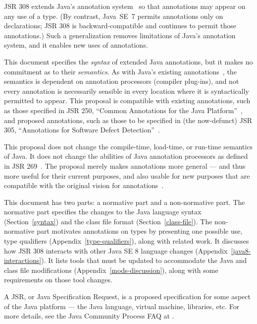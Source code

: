 \documentclass[10pt]{article}
\begin{document}
JSR 308 extends Java's annotation system~\cite{JSR175} so that
annotations may appear on any use of a type.
(By contrast, Java~SE~7 permits annotations only on
declarations; JSR 308 is
backward-compatible and continues to permit those annotations.)
Such a generalization removes
limitations of Java's annotation
system, and it enables new uses of annotations.

This document specifies the \emph{syntax} of extended Java annotations, but
it makes no commitment as to their \emph{semantics}.  As with Java's
existing annotations~\cite{JSR175}, the semantics is dependent on annotation processors
(compiler plug-ins), and not every annotation is necessarily sensible in
every location where it is syntactically permitted to appear.
This proposal is compatible with existing annotations,
such as those specified in JSR 250, ``Common Annotations for the Java
Platform''~\cite{JSR250}, and proposed annotations, such as those to be
specified in (the now-defunct) JSR 305, ``Annotations for Software Defect
Detection''~\cite{JSR305}.

This proposal does not change the compile-time, load-time, or run-time
semantics of Java.  It does not change the abilities of Java annotation
processors as defined in JSR 269~\cite{JSR269}.
The proposal merely makes annotations more general --- and thus more useful
for their current purposes, and also usable for new purposes that are
compatible with the original vision for annotations~\cite{JSR175}.

This document has two parts:  a 
normative part and a 
non-normative part.
The normative part specifies the changes to
the Java language syntax (Section~\ref{syntax}) and
the class file format (Section~\ref{class-file}).
%
The non-normative part
motivates annotations on types by presenting one
possible use, type qualifiers
(Appendix~\ref{type-qualifiers}), along with related work.
It discusses how JSR 308 interacts with 
other Java SE 8 language changes
(Appendix~\ref{java8-interactions}).
It lists tools that
must be updated to accommodate the Java and class file
modifications (Appendix~\ref{mods-discussion}), along with some
requirements on those tool changes.

A JSR, or Java Specification Request, is a proposed specification for some
aspect of the Java platform --- the Java language, virtual machine,
libraries, etc.  For more details, see the Java Community Process FAQ at
.
\end{document}
